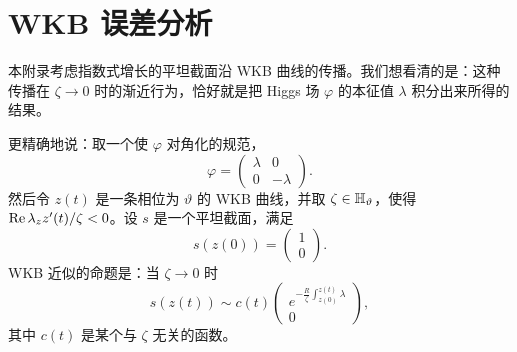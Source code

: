 
\section{WKB 误差分析}
\label{app:wkb-error}

本附录考虑指数式增长的平坦截面沿 WKB 曲线的传播。我们想看清的是：这种传播在 $\zeta\to0$ 时的渐近行为，恰好就是把 Higgs 场 $\varphi$ 的本征值 $\lambda$ 积分出来所得的结果。

更精确地说：取一个使 $\varphi$ 对角化的规范，
\begin{equation}
\varphi = \begin{pmatrix} \lambda & 0 \\ 0 & -\lambda \end{pmatrix}.
\end{equation}
然后令 $z(t)$ 是一条相位为 $\vartheta$ 的 WKB 曲线，并取 $\zeta\in{\mathbb{H}}_\vartheta$，使得 $\operatorname{Re}\lambda_z z'(t)/\zeta<0$。设 $s$ 是一个平坦截面，满足
\begin{equation}
s(z(0)) = \begin{pmatrix} 1 \\ 0 \end{pmatrix}.
\end{equation}
WKB 近似的命题是：当 $\zeta\to0$ 时
\begin{equation} \label{eq:wkb}
s(z(t)) \sim c(t) \begin{pmatrix} e^{-\frac{R}{\zeta} \int_{z(0)}^{z(t)} \lambda} \\ 0 \end{pmatrix},
\end{equation}
其中 $c(t)$ 是某个与 $\zeta$ 无关的函数。

